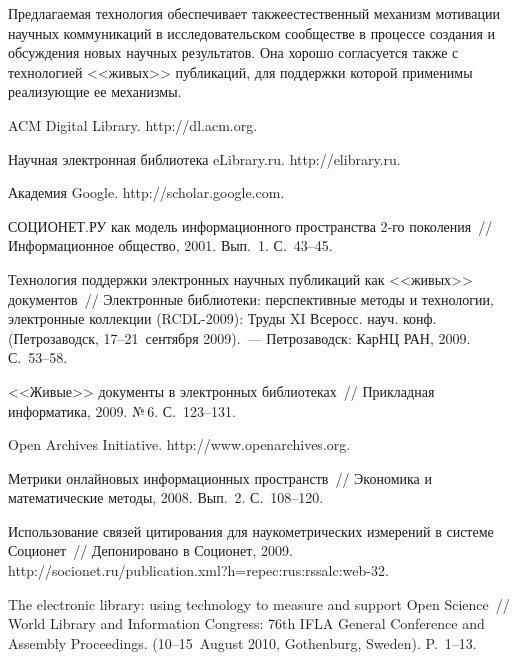 \begin{multicols}{2}
  Предлагаемая технология обеспечивает также\linebreak естественный механизм 
мотивации научных коммуникаций в исследовательском сообществе в процессе 
создания и обсуждения новых научных результа\-тов. Она хорошо согласуется 
также с технологией <<живых>> публикаций, для поддержки которой 
применимы реализующие ее механизмы. 

{\small\frenchspacing
{%
\begin{thebibliography}{99}
  
ACM Digital Library. {\sf http://dl.acm.org}.

Научная электронная библиотека eLibrary.ru. {\sf http://elibrary.ru}.

Академия Google. {\sf http://scholar.google.com}.

СОЦИОНЕТ.РУ как модель информационного пространства 2-го поколения~// 
Информационное общество, 2001. Вып.~1. С.~43--45. 

Технология поддержки электронных научных публикаций как <<живых>> документов~// 
Электронные библиотеки: перспективные методы и технологии, электронные коллек\-ции 
(RCDL-2009): Труды XI Всеросс. науч. конф. (Петрозаводск, 17--21~сентября 2009).~--- 
Петрозаводск: КарНЦ РАН, 2009. С.~53--58.

<<Живые>> документы в электронных библиотеках~// Прикладная информатика, 2009. №\,6. 
С.~123--131.

Open Archives Initiative. {\sf http://www.openarchives.org}.

Метрики онлайновых информационных пространств~// Экономика и математические 
методы, 2008. Вып.~2. С.~108--120.

Использование связей цитирования для наукометрических измерений в системе Соционет~// 
Депонировано в Соционет, 2009. 
{\sf http://socionet.ru/publication.xml?h=repec:\linebreak rus:rssalc:web-32}.

The electronic library: using technology to measure and support Open Science~// World Library 
and Information Congress: 76th IFLA General Conference and Assembly Proceedings. 
(10--15~August 2010, Gothenburg, Sweden). P.~1--13. 


\end{thebibliography}}}
\end{multicols}
